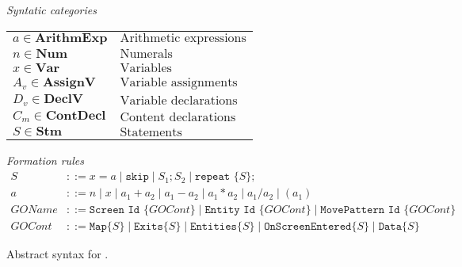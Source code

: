\begin{figure}[htbp]
	\centering
	\textit{Syntatic categories}
	\vspace{4mm}


	\begin{tabular}{l l}
		$a \in \textbf{ArithmExp}$ & $\text{Arithmetic expressions}$ \\ 
		$n \in \textbf{Num}$ & $\text{Numerals}$ \\
		$x \in \textbf{Var}$ & $\text{Variables}$ \\
		$A_v \in \textbf{AssignV}$ & $\text{Variable assignments}$ \\
		$D_v \in \textbf{DeclV}$ & $\text{Variable declarations}$ \\
		$C_m \in \textbf{ContDecl}$ & $\text{Content declarations}$ \\
		$S \in \textbf{Stm}$ & $\text{Statements}$
	\end{tabular}

	\vspace{4mm}
	\textit{Formation rules}
	\begin{align*}
		S&::=x=a\mid \texttt{skip}\mid S_1;S_2\mid \texttt{repeat }\{S\}; \\
		a&::=n\mid x\mid a_1+a_2\mid a_1-a_2\mid a_1*a_2\mid a_1/a_2\mid (a_1) \\
		GOName&::= \texttt{Screen} \texttt{ Id } \{GOCont\} \mid \texttt{Entity} \texttt{ Id } \{GOCont\} \mid \texttt{MovePattern} \texttt{ Id } \{GOCont\} \\
		GOCont&::= \texttt{Map} \{S\} \mid \texttt{Exits} \{S\} \mid \texttt{Entities} \{S\} \mid \texttt{OnScreenEntered} \{S\} \mid \texttt{Data} \{S\}
	\end{align*}

	\caption{Abstract syntax for \dazel{}.}
	\label{fig:AbstractSyntax}
\end{figure}


